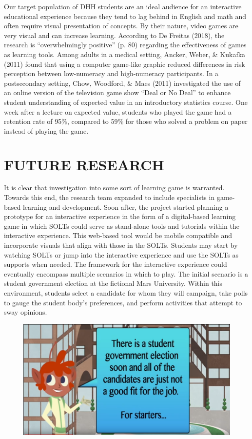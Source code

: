 \documentclass[11.5pt]{sig-alternate} %
\begin{document}
\begin{large}
Our target population of DHH students are an ideal audience for an interactive educational experience because they tend to lag behind in English and math and often require visual presentation of concepts. By their nature, video games are very visual and can increase learning. According to De Freitas (2018), the research is “overwhelmingly positive” (p. 80) regarding the effectiveness of games as learning tools. Among adults in a medical setting, Ancker, Weber, \& Kukafka (2011) found that using a computer game-like graphic reduced differences in risk perception between low-numeracy and high-numeracy participants. In a postsecondary setting, Chow, Woodford, \& Maes (2011) investigated the use of an online version of the television game show “Deal or No Deal” to enhance student understanding of expected value in an introductory statistics course. One week after a lecture on expected value, students who played the game had a retention rate of 95\%, compared to 59\% for those who solved a problem on paper instead of playing the game.

\section*{FUTURE RESEARCH}

It is clear that investigation into some sort of learning game is warranted. Towards this end, the research team expanded to include specialists in game-based learning and development. Soon after, the project started planning a prototype for an interactive experience in the form of a digital-based learning game in which SOLTs could serve as stand-alone tools and tutorials within the interactive experience. This web-based tool would be mobile compatible and incorporate visuals that align with those in the SOLTs. Students may start by watching SOLTs or jump into the interactive experience and use the SOLTs as supports when needed. The framework for the interactive experience could eventually encompass multiple scenarios in which to play. The initial scenario is a student government election at the fictional Mars University. Within this environment, students select a candidate for whom they will campaign, take polls to gauge the student body’s preferences, and perform activities that attempt to sway opinions. 

\begin{figure}[h]
    \centering
    \includegraphics[width=1\linewidth]{Fig_6a.png}
\end{figure}


\end{large}
\end{document}
